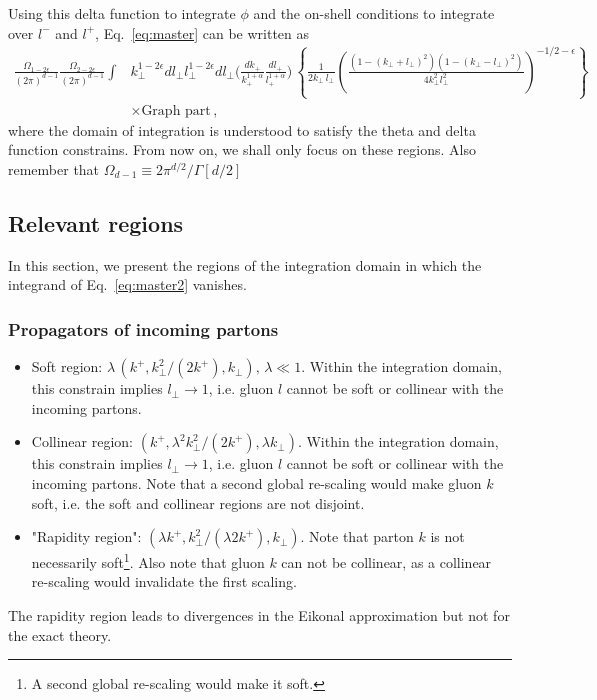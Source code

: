 \documentclass[a4paper,11pt]{article}
\numberwithin{equation}{section}
\begin{document}
%
Using this delta function to integrate $\phi$ and the on-shell conditions to integrate over $l^-$ and $l^+$, 
Eq.~\eqref{eq:master} can be written as
%
\begin{align}
\frac{\Omega_{1-2\epsilon}}{(2\pi)^{d-1}} \frac{\Omega_{2-2\epsilon} }{(2\pi)^{d-1}}
\int  &k_\perp^{1-2\epsilon} d l_\perp l_\perp^{1-2\epsilon} d l_\perp
	    \Big( \frac{dk_+}{k_+^{1+\alpha}} \frac{dl_+}{l_+^{1+\alpha}} \Big) \,
            \left\{
            \frac{1}{2k_\perp\, l_\perp}
            \left( 
            \frac{(1-(k_\perp+l_\perp)^2)(1-(k_\perp-l_\perp)^2)}{4k_\perp^2l_\perp^2}
            \right)^{-1/2-\epsilon}
            \right\}\nonumber\\
           &\times   \text{Graph part} \,,
  \label{eq:master2}
\end{align}
%
where the domain of integration is understood to satisfy the theta and delta function constrains. From now on, we shall only focus on these regions. Also remember that $\Omega_{d-1}\equiv 2\pi^{d/2}/\Gamma[d/2]$



\subsection{Relevant regions}

In this section, we present the regions of the integration domain in which the integrand of Eq.~\eqref{eq:master2} vanishes.

\subsubsection{Propagators of incoming partons}
\begin{itemize}
\item Soft region: $\lambda\, ( k^+, k_\perp^2/(2k^+),  k_\perp ),\, \lambda\ll1$. Within the integration domain, this constrain implies $l_\perp\to 1$, i.e. gluon $l$ cannot be soft or collinear with the incoming partons.
\item Collinear region: $(  k^+, \lambda^2 k_\perp^2/(2k^+), \lambda k_\perp )$. Within the integration domain, this constrain implies $l_\perp\to 1$, i.e. gluon $l$ cannot be soft or collinear with the incoming partons. Note that a second global re-scaling would make gluon $k$ soft, i.e. the soft and collinear regions are not disjoint. 
\item "Rapidity region": $(\lambda  k^+, k_\perp^2/ (\lambda 2k^+),  k_\perp )$. Note that parton $k$ is not necessarily soft\footnote{A second global re-scaling would make it soft.}. Also note that gluon $k$ can not be collinear, as a collinear re-scaling would invalidate the first scaling.
\end{itemize}
The rapidity region leads to divergences in the Eikonal approximation but 
not for the exact theory. 
\end{document}
